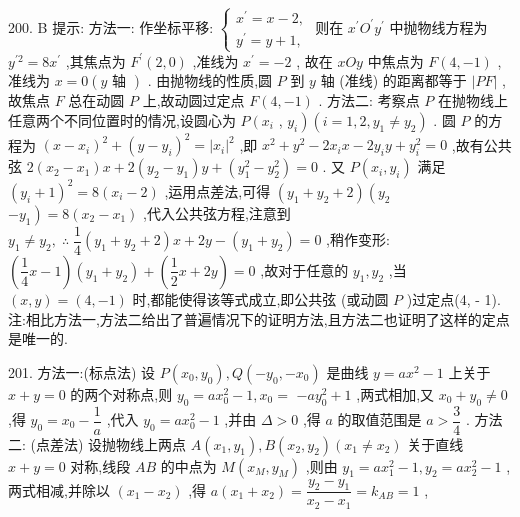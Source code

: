 200. B 提示: 方法一: 作坐标平移: $\left\{  \begin{array}{l} {x}^{\prime } = x - 2, \\  {y}^{\prime } = y + 1, \end{array}\right.$ 则在 ${x}^{\prime }{O}^{\prime }{y}^{\prime }$ 中抛物线方程为 ${y}^{\prime 2} = 8{x}^{\prime }$ ,其焦点为 ${F}^{\prime }\left( {2,0}\right)$ ,准线为 ${x}^{\prime } =  - 2$ , 故在 ${xOy}$ 中焦点为 $F\left( {4, - 1}\right)$ ,准线为 $x = 0\left( {y\text{ 轴 }}\right)$ . 由抛物线的性质,圆 $P$ 到 $y$ 轴 (准线) 的距离都等于 $\left| {PF}\right|$ ,故焦点 $F$ 总在动圆 $P$ 上,故动圆过定点 $F\left( {4, - 1}\right)$ . 方法二: 考察点 $P$ 在抛物线上任意两个不同位置时的情况,设圆心为 $P\left( {x}_{i}\right.$ , $\left. {y}_{i}\right) \left( {i = 1,2,{y}_{1} \neq  {y}_{2}}\right)$ . 圆 $P$ 的方程为 ${\left( x - {x}_{i}\right) }^{2} + {\left( y - {y}_{i}\right) }^{2} = {\left| {x}_{i}\right| }^{2}$ ,即 ${x}^{2} + {y}^{2} - 2{x}_{i}x - 2{y}_{i}y + {y}_{i}^{2} = 0$ ,故有公共弦 $2\left( {{x}_{2} - {x}_{1}}\right) x + 2\left( {{y}_{2} - {y}_{1}}\right) y + \left( {{y}_{1}^{2} - {y}_{2}^{2}}\right)  = 0$ . 又 $P\left( {{x}_{i},{y}_{i}}\right)$ 满足 ${\left( {y}_{i} + 1\right) }^{2} = 8\left( {{x}_{i} - 2}\right)$ ,运用点差法,可得 $\left( {{y}_{1} + {y}_{2} + 2}\right) \left( {y}_{2}\right.$  $\left. {-{y}_{1}}\right)  = 8\left( {{x}_{2} - {x}_{1}}\right)$ ,代入公共弦方程,注意到 ${y}_{1} \neq  {y}_{2},\;\therefore \;\dfrac{1}{4}\left( {{y}_{1} + {y}_{2} + 2}\right) x + {2y} - \left( {{y}_{1} + {y}_{2}}\right)  = 0$ ,稍作变形: $\left( {\dfrac{1}{4}x - 1}\right) \left( {{y}_{1} + {y}_{2}}\right)  + \left( {\dfrac{1}{2}x + {2y}}\right)  = 0$ ,故对于任意的 ${y}_{1},{y}_{2}$ ,当 $\left( {x,y}\right)  = \left( {4, - 1}\right)$ 时,都能使得该等式成立,即公共弦 (或动圆 $P$ )过定点(4, - 1). 注:相比方法一,方法二给出了普遍情况下的证明方法,且方法二也证明了这样的定点是唯一的.

201. 方法一:(标点法) 设 $P\left( {{x}_{0},{y}_{0}}\right) ,Q\left( {-{y}_{0}, - {x}_{0}}\right)$ 是曲线 $y = a{x}^{2} - 1$ 上关于 $x + y = 0$ 的两个对称点,则 ${y}_{0} = a{x}_{0}^{2} - 1,{x}_{0} =$  $- a{y}_{0}^{2} + 1$ ,两式相加,又 ${x}_{0} + {y}_{0} \neq  0$ ,得 ${y}_{0} = {x}_{0} - \dfrac{1}{a}$ ,代入 ${y}_{0} = a{x}_{0}^{2} - 1$ ,并由 $\Delta  > 0$ ,得 $a$ 的取值范围是 $a > \dfrac{3}{4}$ . 方法二: (点差法) 设抛物线上两点 $A\left( {{x}_{1},{y}_{1}}\right) ,B\left( {{x}_{2},{y}_{2}}\right) \left( {{x}_{1} \neq  {x}_{2}}\right)$ 关于直线 $x + y = 0$ 对称,线段 ${AB}$ 的中点为 $M\left( {{x}_{M},{y}_{M}}\right)$ ,则由 ${y}_{1} = a{x}_{1}^{2} - 1,{y}_{2} = a{x}_{2}^{2} - 1$ ,两式相减,并除以 $\left( {{x}_{1} - {x}_{2}}\right)$ ,得 $a\left( {{x}_{1} + {x}_{2}}\right)  = \dfrac{{y}_{2} - {y}_{1}}{{x}_{2} - {x}_{1}} = {k}_{AB} = 1$ ,

